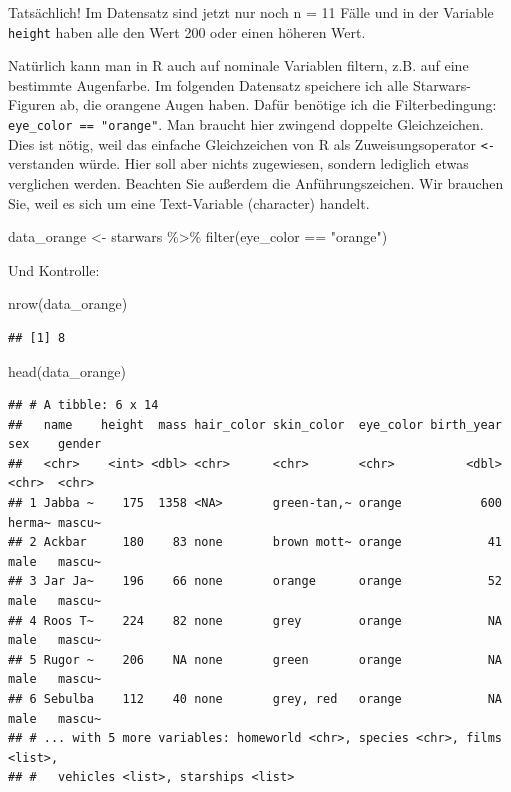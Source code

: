 \documentclass[
]{book}
\newenvironment{Shaded}{\begin{snugshade}}{\end{snugshade}}
\newcommand{\FunctionTok}[1]{\textcolor[rgb]{0.00,0.00,0.00}{#1}}
\newcommand{\NormalTok}[1]{#1}
\newcommand{\OtherTok}[1]{\textcolor[rgb]{0.56,0.35,0.01}{#1}}
\newcommand{\SpecialCharTok}[1]{\textcolor[rgb]{0.00,0.00,0.00}{#1}}
\newcommand{\StringTok}[1]{\textcolor[rgb]{0.31,0.60,0.02}{#1}}
\begin{document}
Tatsächlich! Im Datensatz sind jetzt nur noch n = 11 Fälle und in der Variable \texttt{height} haben alle den Wert 200 oder einen höheren Wert.

Natürlich kann man in R auch auf nominale Variablen filtern, z.B. auf eine bestimmte Augenfarbe. Im folgenden Datensatz speichere ich alle Starwars-Figuren ab, die orangene Augen haben. Dafür benötige ich die Filterbedingung: \texttt{eye\_color\ ==\ "orange"}. Man braucht hier zwingend doppelte Gleichzeichen. Dies ist nötig, weil das einfache Gleichzeichen von R als Zuweisungsoperator \texttt{\textless{}-} verstanden würde. Hier soll aber nichts zugewiesen, sondern lediglich etwas verglichen werden. Beachten Sie außerdem die Anführungszeichen. Wir brauchen Sie, weil es sich um eine Text-Variable (character) handelt.

\begin{Shaded}
\begin{Highlighting}[]
\NormalTok{data\_orange }\OtherTok{\textless{}{-}}\NormalTok{ starwars }\SpecialCharTok{\%\textgreater{}\%} 
  \FunctionTok{filter}\NormalTok{(eye\_color }\SpecialCharTok{==} \StringTok{"orange"}\NormalTok{)}
\end{Highlighting}
\end{Shaded}

Und Kontrolle:

\begin{Shaded}
\begin{Highlighting}[]
\FunctionTok{nrow}\NormalTok{(data\_orange)}
\end{Highlighting}
\end{Shaded}

\begin{verbatim}
## [1] 8
\end{verbatim}

\begin{Shaded}
\begin{Highlighting}[]
\FunctionTok{head}\NormalTok{(data\_orange)}
\end{Highlighting}
\end{Shaded}

\begin{verbatim}
## # A tibble: 6 x 14
##   name    height  mass hair_color skin_color  eye_color birth_year sex    gender
##   <chr>    <int> <dbl> <chr>      <chr>       <chr>          <dbl> <chr>  <chr> 
## 1 Jabba ~    175  1358 <NA>       green-tan,~ orange           600 herma~ mascu~
## 2 Ackbar     180    83 none       brown mott~ orange            41 male   mascu~
## 3 Jar Ja~    196    66 none       orange      orange            52 male   mascu~
## 4 Roos T~    224    82 none       grey        orange            NA male   mascu~
## 5 Rugor ~    206    NA none       green       orange            NA male   mascu~
## 6 Sebulba    112    40 none       grey, red   orange            NA male   mascu~
## # ... with 5 more variables: homeworld <chr>, species <chr>, films <list>,
## #   vehicles <list>, starships <list>
\end{verbatim}
\end{document}
